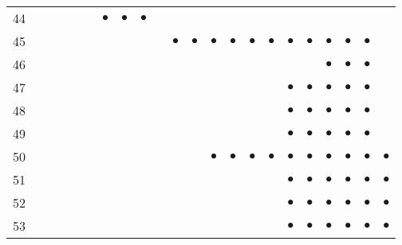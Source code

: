 \documentclass[text.tex]{subfiles}
\begin{document}
{\begin{center}
\begin{longtable}{l|ccccccccccccccccccccc}
44  &           &           &           &           &           & $\bullet$ & $\bullet$ & $\bullet$ &           &           &           &           &           &           &           &           &           &           &           &           &           \\
45  &           &           &           &           &           &           &           &           &           & $\bullet$ & $\bullet$ & $\bullet$ & $\bullet$ & $\bullet$ & $\bullet$ & $\bullet$ & $\bullet$ & $\bullet$ & $\bullet$ & $\bullet$ &           \\
46  &           &           &           &           &           &           &           &           &           &           &           &           &           &           &           &           &           & $\bullet$ & $\bullet$ & $\bullet$ &           \\ 
47  &           &           &           &           &           &           &           &           &           &           &           &           &           &           &           & $\bullet$ & $\bullet$ & $\bullet$ & $\bullet$ & $\bullet$ &           \\
48  &           &           &           &           &           &           &           &           &           &           &           &           &           &           &           & $\bullet$ & $\bullet$ & $\bullet$ & $\bullet$ & $\bullet$ &           \\ 
49  &           &           &           &           &           &           &           &           &           &           &           &           &           &           &           & $\bullet$ & $\bullet$ & $\bullet$ & $\bullet$ & $\bullet$ &           \\
50  &           &           &           &           &           &           &           &           &           &           &           & $\bullet$ & $\bullet$ & $\bullet$ & $\bullet$ & $\bullet$ & $\bullet$ & $\bullet$ & $\bullet$ & $\bullet$ & $\bullet$ \\ 
51  &           &           &           &           &           &           &           &           &           &           &           &           &           &           &           & $\bullet$ & $\bullet$ & $\bullet$ & $\bullet$ & $\bullet$ & $\bullet$ \\
52  &           &           &           &           &           &           &           &           &           &           &           &           &           &           &           & $\bullet$ & $\bullet$ & $\bullet$ & $\bullet$ & $\bullet$ & $\bullet$ \\
53  &           &           &           &           &           &           &           &           &           &           &           &           &           &           &           & $\bullet$ & $\bullet$ & $\bullet$ & $\bullet$ & $\bullet$ & $\bullet$ \\
\bottomrule
\end{longtable}
\end{center}
}

\pagestyle{plain}
\restoregeometry
\end{document}
